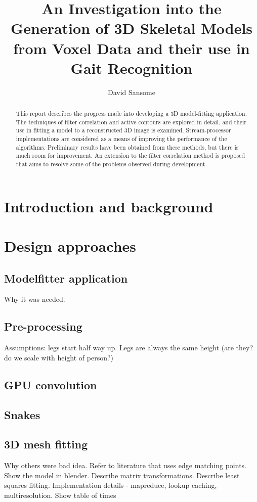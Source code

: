 \documentclass[a4paper,12pt]{report}
\title{An Investigation into the Generation of 3D Skeletal Models from Voxel Data and their use in Gait Recognition}
\author{David Sansome}
\begin{document}


\maketitle

\bigskip
\begin{abstract}
	This report describes the progress made into developing a 3D model-fitting application.
	The techniques of filter correlation and active contours are explored in detail, and their use in fitting a model to a reconstructed 3D image is examined.
	Stream-processor implementations are considered as a means of improving the performance of the algorithms.
	Preliminary results have been obtained from these methods, but there is much room for improvement.
	An extension to the filter correlation method is proposed that aims to resolve some of the problems observed during development.
\end{abstract}

\newpage

\tableofcontents

\chapter{Introduction and background}




\chapter{Design approaches}

\section{Modelfitter application}
Why it was needed.
\section{Pre-processing}
Assumptions: legs start half way up.  Legs are always the same height (are they?  do we scale with height of person?)
\section{GPU convolution}
\section{Snakes}
\section{3D mesh fitting}
Why others were bad idea.
Refer to literature that uses edge matching points.
Show the model in blender.
Describe matrix transformations.
Describe least squares fitting.
Implementation details - mapreduce, lookup caching, multiresolution.  Show table of times
\end{document}

